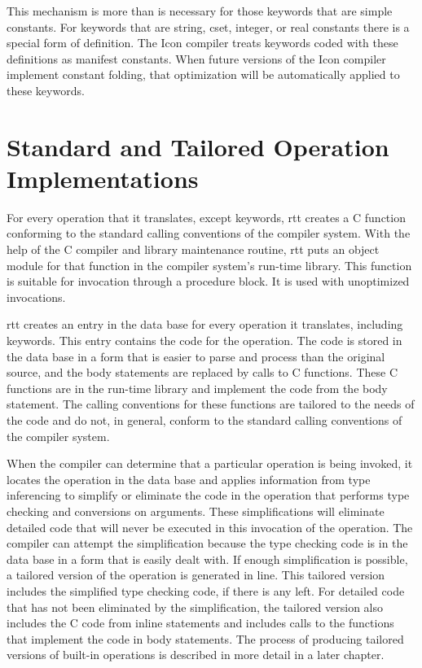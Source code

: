 This mechanism is more than is necessary for those keywords that are
simple constants. For keywords that are string, cset, integer, or real
constants there is a special form of definition. The Icon compiler
treats keywords coded with these definitions as manifest
constants. When future versions of the Icon compiler implement
constant folding, that optimization will be automatically applied to
these keywords.


\section{Standard and Tailored Operation Implementations}

For every operation that it translates, except keywords, rtt creates a
C function conforming to the standard calling conventions of the
compiler system. With the help of the C compiler and library
maintenance routine, rtt puts an object module for that function in
the compiler system's run-time library. This function is suitable for
invocation through a procedure block. It is used with unoptimized
invocations.

rtt creates an entry in the data base for every operation it
translates, including keywords. This entry contains the code for the
operation. The code is stored in the data base in a form that is
easier to parse and process than the original source, and the body
statements are replaced by calls to C functions. These C functions are
in the run-time library and implement the code from the body
statement. The calling conventions for these functions are tailored to
the needs of the code and do not, in general, conform to the standard
calling conventions of the compiler system.

When the compiler can determine that a particular operation is being
invoked, it locates the operation in the data base and applies
information from type inferencing to simplify or eliminate the code in
the operation that performs type checking and conversions on
arguments. These simplifications will eliminate detailed code that
will never be executed in this invocation of the operation. The
compiler can attempt the simplification because the type checking code
is in the data base in a form that is easily dealt with. If enough
simplification is possible, a tailored version of the operation is
generated in line. This tailored version includes the simplified type
checking code, if there is any left.  For detailed code that has not
been eliminated by the simplification, the tailored version also
includes the C code from inline statements and includes calls to the
functions that implement the code in body statements. The process of
producing tailored versions of built-in operations is described in
more detail in a later chapter.


